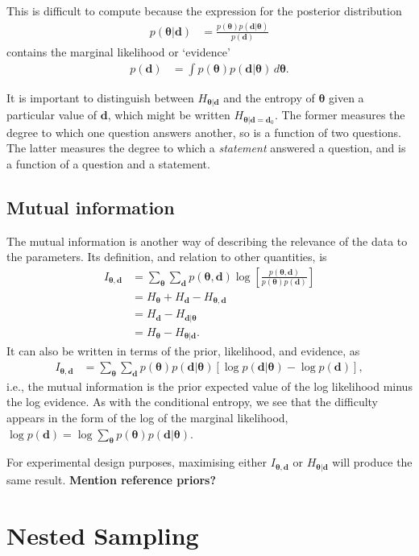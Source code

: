 \documentclass[entropy,article,accept,oneauthor,pdftex,10pt,a4paper]{mdpi}
\renewcommand{\d}{\boldsymbol{d}}
\newcommand{\todo}{\color{orange} \bf}
\newcommand{\x}{\boldsymbol{\theta}}
\begin{document}
This is difficult to compute because the expression
for the posterior distribution
\begin{align}
p(\x | \d) &= \frac{p(\x)p(\d | \x)}{p(\d)}
\end{align}
contains the marginal likelihood or `evidence'
\begin{align}
p(\d) &= \int p(\x) p(\d | \x) \, d\x.
\end{align}

It is important to distinguish between $H_{\x | \d}$ and the
entropy of $\x$ given a particular value of $\d$, which might be written
$H_{\x | \d=\d_0}$.
The former measures the degree to which one question answers
another, so is a function of two questions. The latter measures the
degree to which a {\em statement} answered a question, and is a function
of a question and a statement.



\subsection{Mutual information}
The mutual information is another way of describing the relevance of the
data to the parameters. Its definition, and relation to other quantities, is
\begin{align}
I_{\x, \d} &= \sum_{\x} \sum_{\d} p(\x, \d)
                       \log\left[\frac{p(\x, \d)}{p(\x)p(\d)}\right]\\
           &= H_{\x} + H_{\d} - H_{\x, \d}\\
           &= H_{\d} - H_{\d | \x}\\
           &= H_{\x} - H_{\x | \d}.
\end{align}
It can also be written in terms of the prior, likelihood, and evidence,
as
\begin{align}
I_{\x, \d} &= \sum_{\x} \sum_{\d} p(\x)p(\d | \x)
              \left[\log p(\d | \x) - \log p(\d)\right],
\end{align}
i.e., the mutual information is the prior expected value of the
log likelihood minus the log evidence.
As with the conditional entropy, we see that the difficulty appears in the
form of the log of the marginal likelihood,
$\log p(\d) = \log \sum_{\x} p(\x)p(\d | \x)$.


For experimental design purposes, maximising either $I_{\x, \d}$ or
$H_{\x | \d}$ will produce the same result. {\todo Mention reference priors?}


\section{Nested Sampling}
\end{document}
